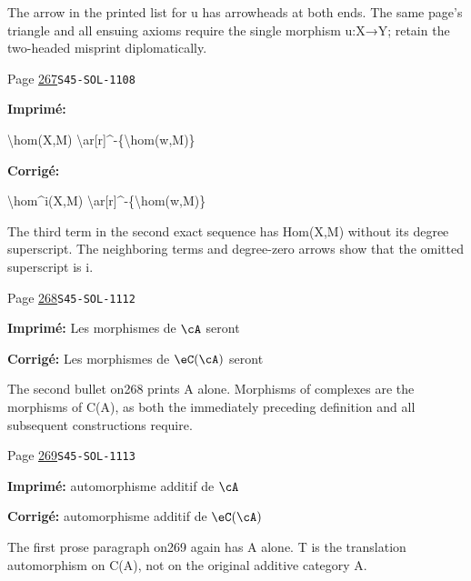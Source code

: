 \begin{description}
\par\noindent The arrow in the printed list for u has arrowheads at both ends. The same page’s triangle and all ensuing axioms require the single morphism u:X→Y; retain the two-headed misprint diplomatically.
\smallskip
\item[\hypertarget{apparatus:FR-0275}{275}] Page \hyperlink{printpage:fr:267}{267}\quad\texttt{S45-SOL-1108}
\par\noindent\textbf{Imprimé:} {\footnotesize\ttfamily\raggedright \textbackslash{}\allowbreak{}hom(\allowbreak{}X,\allowbreak{}M)\allowbreak{} \textbackslash{}\allowbreak{}ar[\allowbreak{}r]\allowbreak{}\textasciicircum{}\allowbreak{}-\allowbreak{}\{\allowbreak{}\textbackslash{}\allowbreak{}hom(\allowbreak{}w,\allowbreak{}M)\allowbreak{}\}\allowbreak{}}
\par\noindent\textbf{Corrigé:} {\footnotesize\ttfamily\raggedright \textbackslash{}\allowbreak{}hom\textasciicircum{}\allowbreak{}i(\allowbreak{}X,\allowbreak{}M)\allowbreak{} \textbackslash{}\allowbreak{}ar[\allowbreak{}r]\allowbreak{}\textasciicircum{}\allowbreak{}-\allowbreak{}\{\allowbreak{}\textbackslash{}\allowbreak{}hom(\allowbreak{}w,\allowbreak{}M)\allowbreak{}\}\allowbreak{}}
\par\noindent The third term in the second exact sequence has Hom(X,M) without its degree superscript. The neighboring terms and degree-zero arrows show that the omitted superscript is i.
\smallskip
\item[\hypertarget{apparatus:FR-0276}{276}] Page \hyperlink{printpage:fr:268}{268}\quad\texttt{S45-SOL-1112}
\par\noindent\textbf{Imprimé:} Les morphismes de $\cA$ seront
\par\noindent\textbf{Corrigé:} Les morphismes de $\eC(\cA)$ seront
\par\noindent The second bullet on268 prints A alone. Morphisms of complexes are the morphisms of C(A), as both the immediately preceding definition and all subsequent constructions require.
\smallskip
\item[\hypertarget{apparatus:FR-0277}{277}] Page \hyperlink{printpage:fr:269}{269}\quad\texttt{S45-SOL-1113}
\par\noindent\textbf{Imprimé:} automorphisme additif de $\cA$
\par\noindent\textbf{Corrigé:} automorphisme additif de $\eC(\cA)$
\par\noindent The first prose paragraph on269 again has A alone. T is the translation automorphism on C(A), not on the original additive category A.

\end{description}
